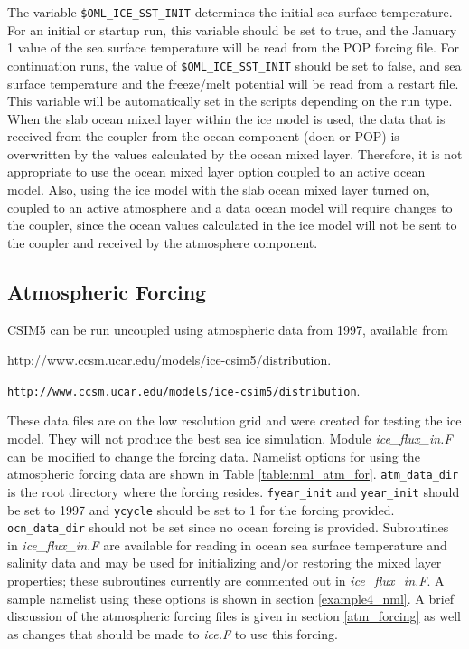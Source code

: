 The variable {\tt \$OML\_ICE\_SST\_INIT} determines the initial sea surface
temperature.  For an initial or startup run, this variable should be
set to true, and the January 1 value of the sea surface temperature
will be read from the POP forcing file.  For continuation runs, the
value of {\tt \$OML\_ICE\_SST\_INIT} should be set to false, and sea
surface temperature and the freeze/melt potential will be read from a restart file.
This variable will be automatically set in the scripts depending on the
run type.  When the slab ocean mixed layer within the ice model is used,
the data that is received from the coupler from the ocean component
(docn or POP) is overwritten by the values calculated by the ocean mixed
layer. Therefore, it is not appropriate to use the ocean mixed layer option
coupled to an active ocean model.  Also, using the ice model with the slab ocean
mixed layer turned on, coupled to an active atmosphere and a data ocean model
will require changes to the coupler, since the ocean values calculated in the
ice model will not be sent to the coupler and received by the atmosphere component.

\subsection{Atmospheric Forcing}

CSIM5 can be run uncoupled using atmospheric data from 1997, available from
\begin{htmlonly}
                      {http://www.ccsm.ucar.edu/models/ice-csim5/distribution}. \\
\end{htmlonly}
\begin{latexonly}
  {\tt http://www.ccsm.ucar.edu/models/ice-csim5/distribution}.
\end{latexonly}

These data files are on the low resolution grid and were created for testing
the ice model.  They will not produce the best sea ice simulation. Module
{\it ice\_flux\_in.F} can be modified to change the forcing data.  Namelist
options for using the atmospheric forcing data are shown in Table 
\ref{table:nml_atm_for}. {\tt atm\_data\_dir} is the root directory where 
the forcing resides. {\tt fyear\_init} and {\tt year\_init} should be set
to 1997 and {\tt ycycle} should be set to 1 for the forcing provided.  
{\tt ocn\_data\_dir} should not be set since no ocean forcing is provided.
Subroutines in {\it ice\_flux\_in.F} are available for reading in ocean sea
surface temperature and salinity data and may be used for initializing and/or
restoring the mixed layer properties; these subroutines currently are commented
out in {\it ice\_flux\_in.F}.  A sample namelist using these options is shown
in section \ref{example4_nml}. A brief discussion of the atmospheric forcing
files is given in section \ref{atm_forcing} as well as changes that should be
made to {\it ice.F} to use this forcing.

